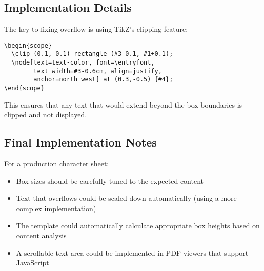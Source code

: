 \documentclass[letterpaper]{article}
\begin{document}
\subsection*{Implementation Details}

The key to fixing overflow is using TikZ's clipping feature:

\begin{verbatim}
\begin{scope}
  \clip (0.1,-0.1) rectangle (#3-0.1,-#1+0.1);
  \node[text=text-color, font=\entryfont, 
        text width=#3-0.6cm, align=justify, 
        anchor=north west] at (0.3,-0.5) {#4};
\end{scope}
\end{verbatim}

This ensures that any text that would extend beyond the box boundaries is clipped and not displayed.

\subsection*{Final Implementation Notes}

For a production character sheet:

\begin{itemize}
    \item Box sizes should be carefully tuned to the expected content
    
    \item Text that overflows could be scaled down automatically (using a more complex implementation)
    
    \item The template could automatically calculate appropriate box heights based on content analysis
    
    \item A scrollable text area could be implemented in PDF viewers that support JavaScript
\end{itemize}
\end{document}
